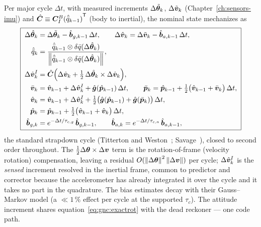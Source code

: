 Per major cycle $\Delta t$, with measured increments
$\Delta\tilde{\bm{\theta}}_k$, $\Delta\tilde{\bm{v}}_k$
(Chapter~\ref{ch:sensors-imu}) and $\hat{\bm{C}} \equiv
{\bm{C}_{I}^{B}(\hat{\bar{q}}_{k-1})}^{\mathsf T}$ (body to inertial), the
nominal state mechanizes as
\begin{equation}
  \boxed{\;
  \begin{aligned}
    \Delta\hat{\bm{\theta}}_k &= \Delta\tilde{\bm{\theta}}_k
      - \hat{\bm{b}}_{g,k-1}\,\Delta t,
    \qquad
    \Delta\hat{\bm{v}}_k = \Delta\tilde{\bm{v}}_k
      - \hat{\bm{b}}_{a,k-1}\,\Delta t,\\
    \hat{\bar{q}}_{k} &= \frac{\hat{\bar{q}}_{k-1} \otimes
      \delta\bar{q}(\Delta\hat{\bm{\theta}}_k)}
      {\left\lVert \hat{\bar{q}}_{k-1} \otimes
      \delta\bar{q}(\Delta\hat{\bm{\theta}}_k) \right\rVert},\\
    \Delta\hat{\bm{v}}^{I}_k &= \hat{\bm{C}}\Bigl(\Delta\hat{\bm{v}}_k
        + \tfrac{1}{2}\,\Delta\hat{\bm{\theta}}_k \times
          \Delta\hat{\bm{v}}_k\Bigr),\\
    \bar{\bm{v}}_{k} &= \hat{\bm{v}}_{k-1} + \Delta\hat{\bm{v}}^{I}_k
      + \hat{\bm{g}}(\hat{\bm{p}}_{k-1})\,\Delta t,
    \qquad
    \bar{\bm{p}}_{k} = \hat{\bm{p}}_{k-1}
      + \tfrac{1}{2}\bigl(\hat{\bm{v}}_{k-1}
        + \bar{\bm{v}}_{k}\bigr)\,\Delta t,\\
    \hat{\bm{v}}_{k} &= \hat{\bm{v}}_{k-1} + \Delta\hat{\bm{v}}^{I}_k
      + \tfrac{1}{2}\bigl(\hat{\bm{g}}(\hat{\bm{p}}_{k-1})
        + \hat{\bm{g}}(\bar{\bm{p}}_{k})\bigr)\,\Delta t,\\
    \hat{\bm{p}}_{k} &= \hat{\bm{p}}_{k-1}
      + \tfrac{1}{2}\bigl(\hat{\bm{v}}_{k-1}
        + \hat{\bm{v}}_{k}\bigr)\,\Delta t,\\
    \hat{\bm{b}}_{g,k} &= e^{-\Delta t/\tau_{c,g}}\,
      \hat{\bm{b}}_{g,k-1},
    \qquad
    \hat{\bm{b}}_{a,k} = e^{-\Delta t/\tau_{c,a}}\,
      \hat{\bm{b}}_{a,k-1},
  \end{aligned}
  \;}
  \label{eq:ekf:mech}
\end{equation}
the standard strapdown cycle (Titterton and
Weston~\cite{titterton2004}; Savage~\cite{savage1998b}), closed to
second order throughout. The $\tfrac{1}{2}\Delta\bm{\theta} \times
\Delta\bm{v}$ term is the rotation-of-frame (velocity rotation)
compensation, leaving a residual $O(\left\lVert \Delta\bm{\theta} \right\rVert^2
\left\lVert \Delta\bm{v} \right\rVert)$ per cycle; $\Delta\hat{\bm{v}}^{I}_k$ is the
\emph{sensed} increment resolved in the inertial frame, common to
predictor and corrector because the accelerometer has already
integrated it over the cycle and it takes no part in the quadrature.
The bias estimates decay with their Gauss--Markov model (a $\ll 1\,\%$
effect per cycle at the supported $\tau_c$). The attitude increment
shares equation~\eqref{eq:gnc:exactrot} with the dead reckoner --- one
code path.

